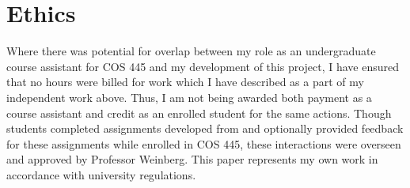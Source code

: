 \documentclass[pageno]{jpaper}
\begin{document}
\section*{Ethics}
Where there was potential for overlap between my role as an undergraduate course assistant for COS 445 and my development of this project, I have ensured that no hours were billed for work which I have described as a part of my independent work above.
Thus, I am not being awarded both payment as a course assistant and credit as an enrolled student for the same actions.
Though students completed assignments developed from and optionally provided feedback for these assignments while enrolled in COS 445, these interactions were overseen and approved by Professor Weinberg.
This paper represents my own work in accordance with university regulations.
\end{document}
